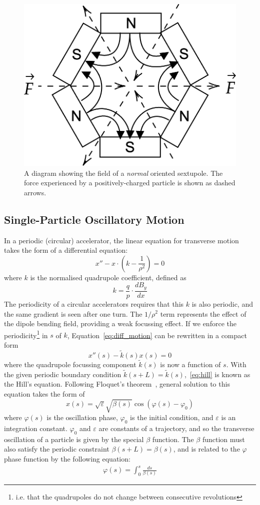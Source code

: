 \documentclass[11pt]{report}
\begin{document}
\begin{figure}
    \centering
    \includegraphics*[width=0.4\linewidth]{sextupole.png}
    \caption{A diagram showing the field of a \textit{normal} oriented sextupole. The force experienced by a positively-charged particle is shown as dashed arrows.}\label{fig:sextupole}
\end{figure}

\subsection{Single-Particle Oscillatory Motion}

In a periodic (circular) accelerator, the linear equation for transverse motion takes the form of a differential equation:
\begin{equation}
  x''-x\cdot\left(k-\frac{1}{\rho^2}\right)=0
  \label{eq:diff_motion}
\end{equation} 
where $k$ is the normalised quadrupole coefficient, defined as
\begin{equation}
  k=\frac{q}{p}\cdot\frac{dB_y}{dx}
  \label{eq:quadrupole}
\end{equation}
The periodicity of a circular accelerators requires that this $k$ is also periodic, and the same gradient is seen after one turn. The $1/\rho^2$ term represents the effect of the dipole bending field, providing a weak focussing effect. If we enforce the periodicity\footnote{i.e. that the quadrupoles do not change between consecutive revolutions} in $s$ of $k$, Equation~\ref{eq:diff_motion} can be rewritten in a compact form
\begin{equation}
  x''(s)-\tilde{k}(s)x(s)=0
  \label{eq:hill}
\end{equation} where the quadrupole focussing component $\tilde{k}(s)$ is now a function of $s$. With the given periodic boundary condition $\tilde k(s+L)=\tilde{k}(s)$,~\ref{eq:hill} is known as the Hill's equation. 
Following Floquet's theorem~\cite{Rossbach:247501}, general solution to this equation takes the form of
\begin{equation}
x(s) =\sqrt{\varepsilon}\sqrt{\beta(s)}\cos(\varphi(s)-\varphi_0)
\label{eq:motion_x}
\end{equation} 
where $\varphi(s)$ is the oscillation phase, $\varphi_0$ is the initial condition, and $\varepsilon$ is an integration constant. $\varphi_0$ and $\varepsilon$ are constants of a trajectory, and so the transverse oscillation of a particle is given by the special $\beta$ function. The $\beta$ function must also satisfy the periodic constraint $\beta(s+L)=\beta(s)$, and is related to the $\varphi$ phase function by the following equation:
\begin{eqnarray}
  \varphi(s) = \int^s_0\frac{ds}{\beta(s)}
  \label{eq:phase_and_beta}
\end{eqnarray}
\end{document}
